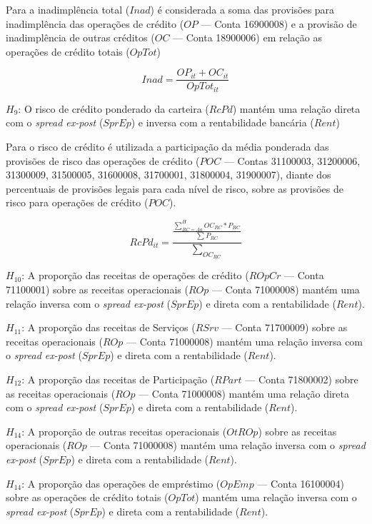 \documentclass[
  12pt,
  12pt,
  openright,
  oneside,
  a4paper,
  chapter=TITLE,
  section=TITLE,
  subsection=TITLE,
  subsubsection=TITLE,
  portugues,
  sumario=tradicional]{abntex2}
\begin{document}
Para a inadimplência total (\(Inad\)) é considerada a soma das provisões para inadimplência das operações de crédito (\(OP\) --- Conta 16900008) e a provisão de inadimplência de outras créditos (\(OC\) --- Conta 18900006) em relação as operações de crédito totais (\(OpTot\))

\begin{equation}
Inad = \frac{ OP_{it} + OC_{it} }{OpTot_{it}}
\end{equation}

\(H_{9}\): O risco de crédito ponderado da carteira (\(RcPd\)) mantém uma relação direta com o \emph{spread ex-post} (\(SprEp\)) e inversa com a rentabilidade bancária (\(Rent\))

Para o risco de crédito é utilizada a participação da média ponderada das provisões de risco das operações de crédito (\(POC\) --- Contas 31100003, 31200006, 31300009, 31500005, 31600008, 31700001, 31800004, 31900007), diante dos percentuais de provisões legais para cada nível de risco, sobre as provisões de risco para operações de crédito (\(POC\)).

\begin{equation}
RcPd_{it} = \frac{\frac{\sum_{RC = Aa}^HOC_{RC}*P_{RC}}{\sum_{}P_{RC}}}{\sum_{OC_{RC}}}
\end{equation}

\(H_{10}\): A proporção das receitas de operações de crédito (\(ROpCr\) --- Conta 71100001) sobre as receitas operacionais (\(ROp\) --- Conta 71000008) mantém uma relação inversa com o \emph{spread ex-post} (\(SprEp\)) e direta com a rentabilidade (\(Rent\)).

\(H_{11}\): A proporção das receitas de Serviços (\(RSrv\) --- Conta 71700009) sobre as receitas operacionais (\(ROp\) --- Conta 71000008) mantém uma relação inversa com o \emph{spread ex-post} (\(SprEp\)) e direta com a rentabilidade (\(Rent\)).

\(H_{12}\): A proporção das receitas de Participação (\(RPart\) --- Conta 71800002) sobre as receitas operacionais (\(ROp\) --- Conta 71000008) mantém uma relação direta com o \emph{spread ex-post} (\(SprEp\)) e direta com a rentabilidade (\(Rent\)).

\(H_{14}\): A proporção de outras receitas operacionais (\(OtROp\)) sobre as receitas operacionais (\(ROp\) --- Conta 71000008) mantém uma relação inversa com o \emph{spread ex-post} (\(SprEp\)) e direta com a rentabilidade (\(Rent\)).

\(H_{14}\): A proporção das operações de empréstimo (\(OpEmp\) --- Conta 16100004) sobre as operações de crédito totais (\(OpTot\)) mantém uma relação inversa com o \emph{spread ex-post} (\(SprEp\)) e direta com a rentabilidade (\(Rent\)).
\end{document}
